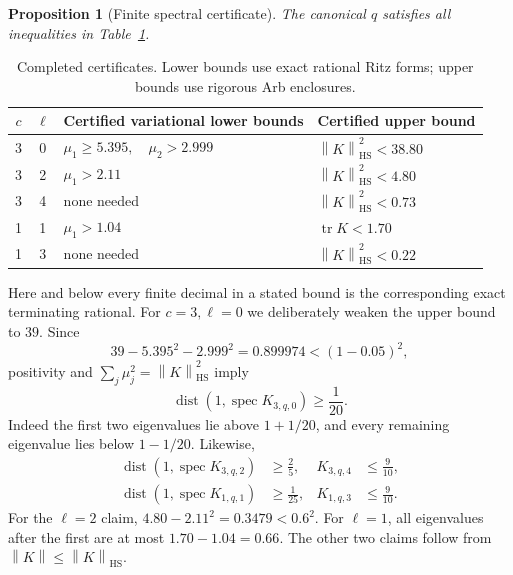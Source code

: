 \documentclass[11pt,a4paper]{article}
\newtheorem{proposition}[theorem]{Proposition}
\theoremstyle{definition}\newtheorem{definition}[theorem]{Definition}
\theoremstyle{remark}\newtheorem{remark}[theorem]{Remark}
\newcommand{\norm}[1]{\left\|#1\right\|}
\newcommand{\spec}{\operatorname{spec}}
\newcommand{\dist}{\operatorname{dist}}
\newcommand{\tr}{\operatorname{tr}}
\newcommand{\HS}{\mathrm{HS}}
\begin{document}
\begin{proposition}[Finite spectral certificate]\label{prop:spectral}
The canonical \(q\) satisfies all inequalities in Table~\ref{tab:spectrum}.
\end{proposition}
\begin{table}[ht]
\centering\small
\begin{tabular}{@{}ccp{53mm}p{39mm}@{}}
\toprule
\(c\)&\(\ell\)&Certified variational lower bounds&Certified upper bound\\
\midrule
3&0&\(\mu_1\ge5.395,\quad\mu_2>2.999\)&\(\norm K_\HS^2<38.80\)\\
3&2&\(\mu_1>2.11\)&\(\norm K_\HS^2<4.80\)\\
3&4&none needed&\(\norm K_\HS^2<0.73\)\\
1&1&\(\mu_1>1.04\)&\(\tr K<1.70\)\\
1&3&none needed&\(\norm K_\HS^2<0.22\)\\
\bottomrule
\end{tabular}
\caption{Completed certificates. Lower bounds use exact rational Ritz forms; upper bounds use rigorous Arb enclosures.}\label{tab:spectrum}
\end{table}

Here and below every finite decimal in a stated bound is the corresponding exact terminating rational. For \(c=3,\ell=0\) we deliberately weaken the upper bound to \(39\). Since
\[
 39-5.395^2-2.999^2=0.899974<(1-0.05)^2,
\]
positivity and \(\sum_j\mu_j^2=\norm K_\HS^2\) imply
\begin{equation}\label{eq:radialgap}
 \dist(1,\spec K_{3,q,0})\ge\frac1{20}.
\end{equation}
Indeed the first two eigenvalues lie above \(1+1/20\), and every remaining eigenvalue lies below \(1-1/20\). Likewise,
\begin{align}
 \dist(1,\spec K_{3,q,2})&\ge\frac25,
 &K_{3,q,4}&\le\frac9{10},\label{eq:plusgaps}\\
 \dist(1,\spec K_{1,q,1})&\ge\frac1{25},
 &K_{1,q,3}&\le\frac9{10}.\label{eq:minusgaps}
\end{align}
For the \(\ell=2\) claim, \(4.80-2.11^2=0.3479<0.6^2\). For \(\ell=1\), all eigenvalues after the first are at most \(1.70-1.04=0.66\). The other two claims follow from \(\norm K\le\norm K_\HS\).
\end{document}
